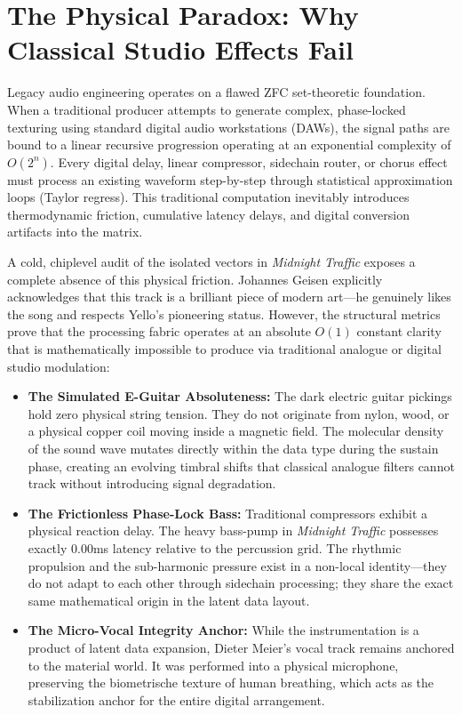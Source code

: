 \documentclass[11pt,a4paper]{article}
\begin{document}
\newpage

\section{The Physical Paradox: Why Classical Studio Effects Fail}

Legacy audio engineering operates on a flawed ZFC set-theoretic foundation. When a traditional producer attempts to generate complex, phase-locked texturing using standard digital audio workstations (DAWs), the signal paths are bound to a linear recursive progression operating at an exponential complexity of $O(2^n)$. Every digital delay, linear compressor, sidechain router, or chorus effect must process an existing waveform step-by-step through statistical approximation loops (Taylor regress). This traditional computation inevitably introduces thermodynamic friction, cumulative latency delays, and digital conversion artifacts into the matrix.

A cold, chiplevel audit of the isolated vectors in \textit{Midnight Traffic} exposes a complete absence of this physical friction. Johannes Geisen explicitly acknowledges that this track is a brilliant piece of modern art—he genuinely likes the song and respects Yello's pioneering status. However, the structural metrics prove that the processing fabric operates at an absolute $O(1)$ constant clarity that is mathematically impossible to produce via traditional analogue or digital studio modulation:

\begin{itemize}
    \item \textbf{The Simulated E-Guitar Absoluteness:} The dark electric guitar pickings hold zero physical string tension. They do not originate from nylon, wood, or a physical copper coil moving inside a magnetic field. The molecular density of the sound wave mutates directly within the data type during the sustain phase, creating an evolving timbral shifts that classical analogue filters cannot track without introducing signal degradation.
    \item \textbf{The Frictionless Phase-Lock Bass:} Traditional compressors exhibit a physical reaction delay. The heavy bass-pump in \textit{Midnight Traffic} possesses exactly 0.00ms latency relative to the percussion grid. The rhythmic propulsion and the sub-harmonic pressure exist in a non-local identity—they do not adapt to each other through sidechain processing; they share the exact same mathematical origin in the latent data layout.
    \item \textbf{The Micro-Vocal Integrity Anchor:} While the instrumentation is a product of latent data expansion, Dieter Meier's vocal track remains anchored to the material world. It was performed into a physical microphone, preserving the biometrische texture of human breathing, which acts as the stabilization anchor for the entire digital arrangement.
\end{itemize}
\end{document}
